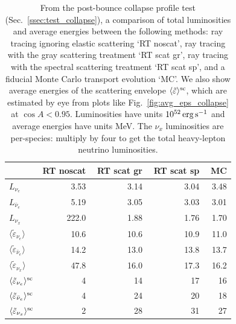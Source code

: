 \documentclass[aps,floatfix,prd,superscriptaddress,twocolumn]{revtex4-1}
\begin{document}
\begin{table}%
  \caption{
    From the post-bounce collapse profile test (Sec.~\ref{ssec:test_collapse}),
    a comparison of total luminosities and average energies between
    the following methods:
    ray tracing ignoring elastic scattering `RT noscat',
    ray tracing with the gray scattering treatment `RT scat gr',
    ray tracing with the spectral scattering treatment `RT scat sp', and
    a fiducial Monte Carlo transport evolution `MC'.
    We also show average energies of the scattering envelope
    $\langle\tilde{\varepsilon}\rangle^{\rm sc}$, which are estimated by eye
    from plots like Fig.~\ref{fig:avg_eps_collapse} at $\cos A < 0.95$.
    Luminosities have units $10^{52}\,{\rm erg}\,{\rm s}^{-1}$ and
    average energies have units MeV.
    The $\nu_x$ luminosities are per-species:
    multiply by four to get the total heavy-lepton neutrino luminosities.
  }
  \label{tab:collapse_rt_vs_mc}
  \begin{tabularx}{\columnwidth}{X r r r r}
    & {\bf RT noscat} & \,\,{\bf RT scat gr} & \,\,{\bf RT scat sp} & \,\,{\bf MC} \\
    \hline
    $L_{\nu_e}$                                         &  3.53 & 3.14 & 3.04 & 3.48 \\
    $L_{\bar{\nu}_e}$                                   & 5.19 & 3.05 & 3.03 & 3.01 \\
    $L_{\nu_x}$                                         & 222.0  & 1.88 & 1.76 & 1.70 \\
    $\langle \tilde{\varepsilon}_{\nu_e} \rangle$               &  10.6 & 10.6 & 10.9 & 11.0 \\
    $\langle \tilde{\varepsilon}_{\bar{\nu}_e} \rangle$         & 14.2 & 13.0 & 13.8 & 13.7 \\
    $\langle \tilde{\varepsilon}_{\nu_x} \rangle$               & 47.8 & 16.0 & 17.3 & 16.2 \\
    $\langle \tilde{\varepsilon}_{\nu_e} \rangle^{\rm sc}$      & 4    & 14   & 17   & 16 \\
    $\langle \tilde{\varepsilon}_{\bar{\nu}_e} \rangle^{\rm sc}$& 4    & 24   & 20   & 18 \\
    $\langle \tilde{\varepsilon}_{\nu_x} \rangle^{\rm sc}$      & 2    & 28   & 31   & 27 \\
    \hline
  \end{tabularx}
\end{table}
\end{document}

